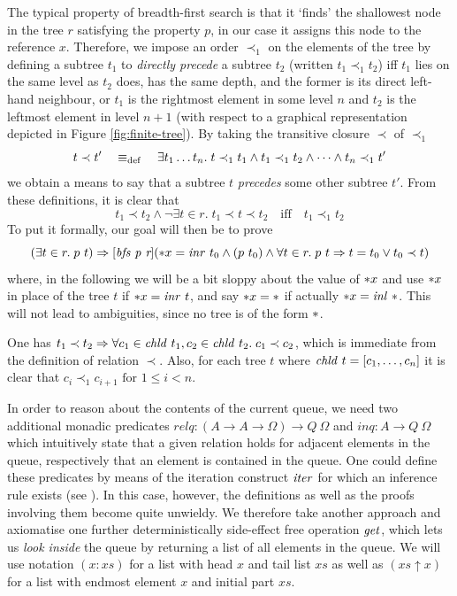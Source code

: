The typical property of breadth-first search is that it `finds' the shallowest
node in the tree $r$ satisfying the property $p$, \IE in our case it assigns
this node to the reference $x$. Therefore, we impose an order $\prec_1$ on the
elements of the tree by defining a subtree $t_1$ to \emph{directly precede} a
subtree $t_2$ (written $t_1 \prec_1 t_2$) iff $t_1$ lies on the same level as $t_2$
does, \IE has the same depth, and the former is its direct left-hand neighbour,
or $t_1$ is the rightmost element in some level $n$ and $t_2$ is the leftmost
element in level $n+1$ (with respect to a graphical representation depicted in
Figure \ref{fig:finite-tree}). By taking the transitive closure $\prec$ of $\prec_1$
\[
t \prec t' \quad\equiv_{\mathrm{def}}\quad \exists t_1\ldots t_n.\; t \prec_1 t_1 \land t_1 \prec_1 t_2 \land \cdots \land  t_n \prec_1 t'
\]
we obtain a means to say that a subtree $t$ \emph{precedes} some other subtree
$t'$. From these definitions, it is clear that 
\[t_1 \prec t_2 \land \lnot \exists t \in r.\; t_1\prec t\prec t_2 \quad\text{iff}\quad t_1 \prec_1 t_2\]
To put it formally, our goal will then be  to prove
\[
  (\exists t \in r.\; p\ t) \Rightarrow [\mbox{\itshape bfs p r}]({\ast x} = \mathit{inr}~t_0 \land (p\ t_0) \land \forall t \in r.\; p\ t \Rightarrow t = t_0 \lor t_0 \prec t)
\]
where, in the following we will be a bit sloppy about the value of ${\ast x}$ and
use ${\ast x}$ in place of the tree $t$ if ${\ast x} = \mathit{inr}~t$, and say ${\ast x} =
\ast$ if actually ${\ast x} = \mathit{inl}~\ast$. This will not lead to ambiguities,
since no tree is of the form $\ast$.
\begin{rem}
\label{rem-chld}
One has $t_1 \prec t_2 \Rightarrow \forall c_1\in\mathit{chld}~t_1, c_2 \in \mathit{chld}~t_2.\; c_1 \prec
c_2$, which is immediate from the definition of relation $\prec$. Also, for 
each tree $t$ where $\mathit{chld}~t = [c_1,\ldots, c_n]$ it is clear that
$c_i \prec_{1} c_{i+1} \text{ for } 1\leq i<n$.
\end{rem}

In order to reason about the contents of the current queue, we need two
additional monadic predicates $relq : (A \to A \to \Omega) \to Q\ \Omega$ and $inq : A \to Q\ \Omega $
which intuitively state that a given relation holds for adjacent elements in the
queue, respectively that an element is contained in the queue. One could define
these predicates by means of the iteration construct $\mathit{iter}$ for which an
inference rule exists (see \cite{SchroederMossakowski:PDL}). In this case,
however, the definitions as well as the proofs involving them become quite
unwieldy. We therefore take another approach and axiomatise one further
deterministically side-effect free operation $\mathit{get}$, which lets us
\emph{look inside} the queue by returning a list of all elements in the queue.
We will use notation $(x:xs)$ for a list with head $x$ and tail list $xs$ as
well as $(xs\uparrow x)$ for a list with endmost element $x$ and initial part $xs$.

